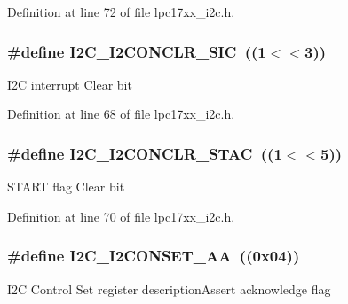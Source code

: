 Definition at line 72 of file lpc17xx\+\_\+i2c.\+h.

\subsubsection[{\texorpdfstring{I2\+C\+\_\+\+I2\+C\+O\+N\+C\+L\+R\+\_\+\+S\+IC}{I2C_I2CONCLR_SIC}}]{\setlength{\rightskip}{0pt plus 5cm}\#define I2\+C\+\_\+\+I2\+C\+O\+N\+C\+L\+R\+\_\+\+S\+IC~((1$<$$<$3))}\hypertarget{group___i2_c___private___macros_ga36753112210a8c33d566b572b63b753b}{}\label{group___i2_c___private___macros_ga36753112210a8c33d566b572b63b753b}
I2C interrupt Clear bit 

Definition at line 68 of file lpc17xx\+\_\+i2c.\+h.

\subsubsection[{\texorpdfstring{I2\+C\+\_\+\+I2\+C\+O\+N\+C\+L\+R\+\_\+\+S\+T\+AC}{I2C_I2CONCLR_STAC}}]{\setlength{\rightskip}{0pt plus 5cm}\#define I2\+C\+\_\+\+I2\+C\+O\+N\+C\+L\+R\+\_\+\+S\+T\+AC~((1$<$$<$5))}\hypertarget{group___i2_c___private___macros_gab6148bf41d7fc32bd259d2f6a7d7667d}{}\label{group___i2_c___private___macros_gab6148bf41d7fc32bd259d2f6a7d7667d}
S\+T\+A\+RT flag Clear bit 

Definition at line 70 of file lpc17xx\+\_\+i2c.\+h.

\subsubsection[{\texorpdfstring{I2\+C\+\_\+\+I2\+C\+O\+N\+S\+E\+T\+\_\+\+AA}{I2C_I2CONSET_AA}}]{\setlength{\rightskip}{0pt plus 5cm}\#define I2\+C\+\_\+\+I2\+C\+O\+N\+S\+E\+T\+\_\+\+AA~((0x04))}\hypertarget{group___i2_c___private___macros_ga784c4b2fe7f3299e338655d2ddbf283c}{}\label{group___i2_c___private___macros_ga784c4b2fe7f3299e338655d2ddbf283c}
I2C Control Set register description\+Assert acknowledge flag 

